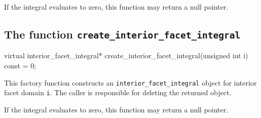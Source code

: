 If the integral evaluates to zero, this function may return a null
pointer.

\subsection{The function \texttt{create\_interior\_facet\_integral}}

\begin{code}
virtual interior_facet_integral*
create_interior_facet_integral(unsigned int i) const = 0;
\end{code}

This factory function constructs an \texttt{interior\_facet\_integral}
object for interior facet domain \texttt{i}. The caller is responsible
for deleting the returned object.

If the integral evaluates to zero, this function may return a null
pointer.
